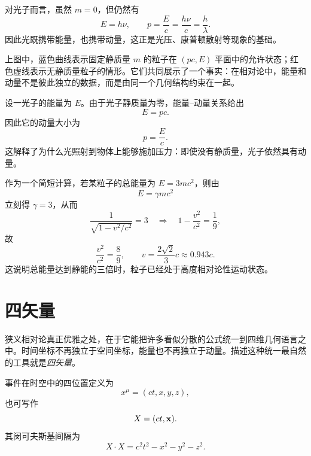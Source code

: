对光子而言，虽然 $m=0$，但仍然有
\[
E=h\nu,
\qquad
p=\frac{E}{c}=\frac{h\nu}{c}=\frac{h}{\lambda}.
\]
因此光既携带能量，也携带动量，这正是光压、康普顿散射等现象的基础。

\begin{center}
\end{center}

上图中，蓝色曲线表示固定静质量 $m$ 的粒子在 $(pc,E)$ 平面中的允许状态；红色虚线表示无静质量粒子的情形。它们共同展示了一个事实：在相对论中，能量和动量不是彼此独立的数据，而是由同一个几何结构约束在一起。

\begin{example}[光子的动量]
设一光子的能量为 $E$。由于光子静质量为零，能量--动量关系给出
\[
E=pc.
\]
因此它的动量大小为
\[
p=\frac{E}{c}.
\]
这解释了为什么光照射到物体上能够施加压力：即使没有静质量，光子依然具有动量。
\end{example}

作为一个简短计算，若某粒子的总能量为 $E=3mc^2$，则由
\[
E=\gamma mc^2
\]
立刻得 $\gamma=3$，从而
\[
\frac{1}{\sqrt{1-v^2/c^2}}=3
\quad\Longrightarrow\quad
1-\frac{v^2}{c^2}=\frac19,
\]
故
\[
\frac{v^2}{c^2}=\frac89,
\qquad
v=\frac{2\sqrt{2}}{3}c\approx 0.943c.
\]
这说明总能量达到静能的三倍时，粒子已经处于高度相对论性运动状态。

\section{四矢量}

狭义相对论真正优雅之处，在于它能把许多看似分散的公式统一到四维几何语言之中。时间坐标不再独立于空间坐标，能量也不再独立于动量。描述这种统一最自然的工具就是\emph{四矢量}。

\begin{definition}[四位置]
事件在时空中的四位置定义为
\[
x^\mu=(ct, x, y, z),
\]
也可写作
\[
X=(ct,\vb{x}).
\]
其闵可夫斯基间隔为
\[
X\cdot X = c^2 t^2 - x^2 - y^2 - z^2.
\]
\end{definition}


